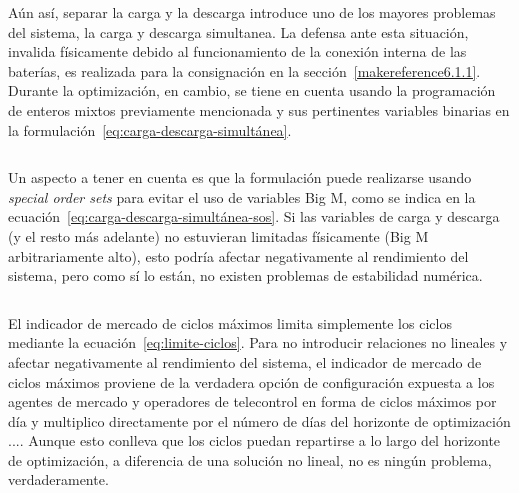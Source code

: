 \begin{equation}
  \label{eq:eficiencia-carga}
\end{equation}

\begin{equation}
  \label{eq:eficiencia-descarga}
\end{equation}

Aún así, separar la carga y la descarga introduce uno de los mayores problemas del sistema, la carga y descarga simultanea. La defensa ante esta situación, invalida físicamente debido al funcionamiento de la conexión interna de las baterías, es realizada para la consignación en la sección~\ref{makereference6.1.1}. Durante la optimización, en cambio, se tiene en cuenta usando la programación de enteros mixtos previamente mencionada y sus pertinentes variables binarias en la formulación~\ref{eq:carga-descarga-simultánea}.

\begin{equation}
  \label{eq:carga-descarga-simultánea}
\end{equation}

Un aspecto a tener en cuenta es que la formulación puede realizarse usando \textit{special order sets} para evitar el uso de variables Big M, como se indica en la ecuación~\ref{eq:carga-descarga-simultánea-sos}. Si las variables de carga y descarga (y el resto más adelante) no estuvieran limitadas físicamente (Big M arbitrariamente alto), esto podría afectar negativamente al rendimiento del sistema, pero como sí lo están, no existen problemas de estabilidad numérica.

\begin{equation}
  \label{eq:carga-descarga-simultánea-sos}
\end{equation}

El indicador de mercado de ciclos máximos limita simplemente los ciclos mediante la ecuación~\ref{eq:limite-ciclos}. Para no introducir relaciones no lineales y afectar negativamente al rendimiento del sistema, el indicador de mercado de ciclos máximos proviene de la verdadera opción de configuración expuesta a los agentes de mercado y operadores de telecontrol en forma de ciclos máximos por día y multiplico directamente por el número de días del horizonte de optimización \( ... \). Aunque esto conlleva que los ciclos puedan repartirse a lo largo del horizonte de optimización, a diferencia de una solución no lineal, no es ningún problema, verdaderamente.

\begin{equation}
  \label{eq:limite-ciclos}
\end{equation}

